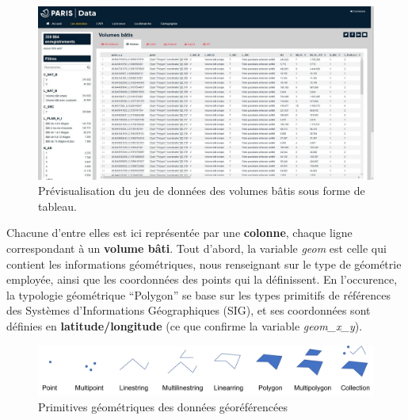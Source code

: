 \documentclass[
  11pt,
  french,
]{article}
\begin{document}
\begin{tcolorbox}
\begin{figure}

{\centering \includegraphics[width=0.9\linewidth]{__imgs/site_odp_tableau} 

}

\caption[Prévisualisation  du jeu de données des volumes bâtis sous forme de tableau.  -  https://opendata.paris.fr/]{Prévisualisation  du jeu de données des volumes bâtis sous forme de tableau.}\label{fig:odp_tbl}
\end{figure}
\end{tcolorbox}

\hfill\break
Chacune d'entre elles est ici représentée par une \textbf{colonne},
chaque ligne correspondant à un \textbf{volume bâti}. Tout d'abord, la
variable \emph{geom} est celle qui contient les informations
géométriques, nous renseignant sur le type de géométrie employée, ainsi
que les coordonnées des points qui la définissent. En l'occurence, la
typologie géométrique ``Polygon'' se base sur les types primitifs de
références des Systèmes d'Informations Géographiques (SIG), et ses
coordonnées sont définies en \textbf{latitude/longitude} (ce que
confirme la variable \emph{geom\_x\_y}).\\

\begin{tcolorbox}
\begin{figure}

{\centering \includegraphics[width=0.9\linewidth]{__imgs/primitives_geometriques} 

}

\caption[Primitives géométriques des données géoréférencées  -  \url{https://github.com/ClementDelgrange/Cours_programmation_SIG/}]{Primitives géométriques des données géoréférencées}\label{fig:prim_geom}
\end{figure}
\end{tcolorbox}
\end{document}
